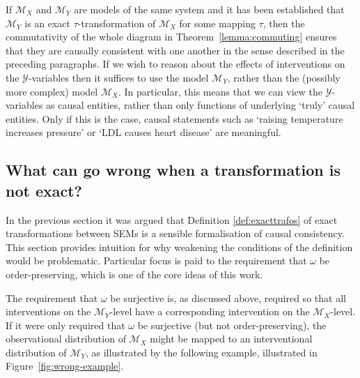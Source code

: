 If $\mathcal{M}_X$ and $\mathcal{M}_Y$ are models of the same system and it has been established that $\mathcal{M}_Y$ is an exact $\tau$-transformation of $\mathcal{M}_X$ for some mapping $\tau$, then the commutativity of the whole diagram in Theorem~\ref{lemma:commuting} ensures that they are causally consistent with one another in the sense described in the preceding paragraphs.
If we wish to reason about the effects of interventions on the $\mathcal{Y}$-variables then it suffices to use the model $\mathcal{M}_Y$, rather than the (possibly more complex) model $\mathcal{M}_X$.
In particular, this means that we can view the $\mathcal{Y}$-variables as causal entities, rather than only functions of underlying `truly' causal entities.
Only if this is the case, causal statements such as `raising temperature increases pressure' or `LDL causes heart disease' are meaningful.

\subsection{What can go wrong when a transformation is not exact?}\label{sec:wrong}

In the previous section it was argued that Definition \ref{def:exacttrafos} of exact transformations between SEMs is a sensible formalisation of causal consistency.
This section provides intuition for why weakening the conditions of the definition would be problematic.
Particular focus is paid to the requirement that $\omega$ be order-preserving, which is one of the core ideas of this work.

The requirement that $\omega$ be surjective is, as discussed above, required so that all interventions on the $\mathcal{M}_Y$-level have a corresponding intervention on the $\mathcal{M}_X$-level.
If it were only required that $\omega$ be surjective (but not order-preserving), the observational distribution of $\mathcal{M}_X$ might be mapped to an interventional distribution of $\mathcal{M}_Y$, as illustrated by the following example, illustrated in Figure~\ref{fig:wrong-example}.

